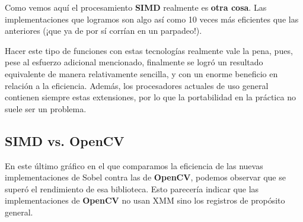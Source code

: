 Como vemos aquí el procesamiento \textbf{SIMD} realmente es \textbf{otra cosa}.
Las implementaciones que logramos son algo así como 10 veces más eficientes que
las anteriores (¡que ya de por sí corrían en un parpadeo!).

Hacer este tipo de funciones con estas tecnologías realmente vale la pena, pues,
pese al esfuerzo adicional mencionado, finalmente se logró un resultado equivalente
de manera relativamente sencilla, y con un enorme beneficio en relación a la eficiencia.
Además, los procesadores actuales de uso general contienen siempre estas extensiones,
por lo que la portabilidad en la práctica no suele ser un problema.

\subsection{SIMD vs. OpenCV}


En este último gráfico en el que comparamos la eficiencia de las nuevas implementaciones
de Sobel contra las de \textbf{OpenCV}, podemos observar que se superó el rendimiento de esa
biblioteca. Esto parecería indicar que las implementaciones de \textbf{OpenCV} no usan
XMM sino los registros de propósito general.


